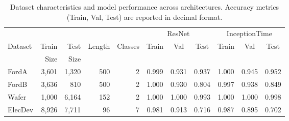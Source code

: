 \begin{table}[!htbp]
\caption{Dataset characteristics and model performance across architectures. Accuracy metrics (Train, Val, Test) are reported in decimal format.}
\label{tab:dataset_performance}
\setlength{\tabcolsep}{0pt}
\begin{tabular*}{\textwidth}{@{\extracolsep{\fill}} lrrrr ccc ccc @{}}
\toprule
& & & & & \multicolumn{3}{c}{ResNet} & \multicolumn{3}{c}{InceptionTime} \\
\cmidrule(lr){6-8} \cmidrule(lr){9-11}
Dataset & Train & Test & Length & Classes & Train & Val & Test & Train & Val & Test \\
& Size & Size & & & & & & & & \\
\midrule
FordA & 3,601 & 1,320 & 500 & 2 & 0.999 & 0.931 & 0.937 & 1.000 & 0.945 & 0.952 \\
FordB & 3,636 & 810 & 500 & 2 & 1.000 & 0.930 & 0.804 & 0.997 & 0.938 & 0.849 \\
Wafer & 1,000 & 6,164 & 152 & 2 & 1.000 & 1.000 & 0.993 & 1.000 & 1.000 & 0.998 \\
ElecDev & 8,926 & 7,711 & 96 & 7 & 0.981 & 0.913 & 0.716 & 0.987 & 0.895 & 0.702 \\
\bottomrule
\end{tabular*} 
\end{table}